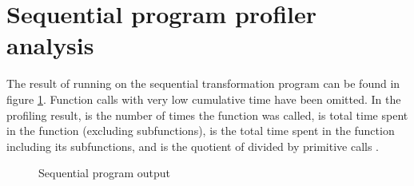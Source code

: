 \section{Sequential program profiler analysis} \label{section:sequential_profiler}
The result of running  on the sequential transformation program can be found in figure \ref{fig:sequential_profiler}. Function calls with very
low cumulative time have been omitted. In the profiling result,  is the number of times the function was called,
 is total time spent in the function (excluding subfunctions),  is the total time spent in the function
including its subfunctions, and  is the quotient of  divided by primitive calls \cite{26_2tppp2d}.

\begin{figure}[ht]
  
  \caption{Sequential program  output}
  \label{fig:sequential_profiler}
\end{figure}

